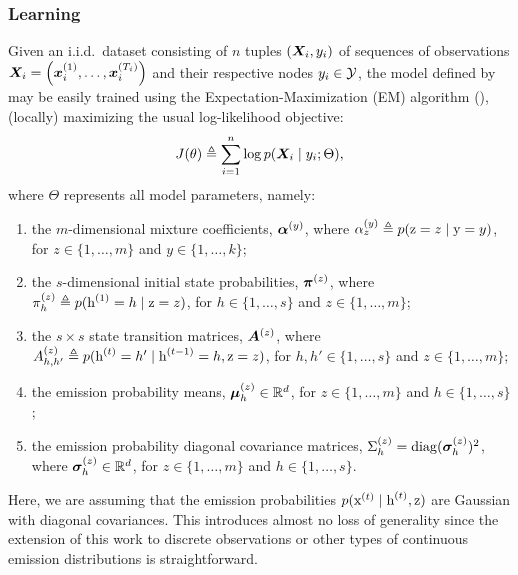 \subsubsection{Learning}
\label{sec:spamhmm_learning}
Given an i.i.d.\ dataset consisting of $n$ tuples $({\bm{X}}_i, y_i)$ of sequences of observations ${\bm{X}}_i = \left({\bm{x}}_i^{(1)}, \dots,{\bm{x}}_i^{(T_i)} \right)$ and their respective nodes $y_i \in {\mathcal{Y}}$, the model defined by  may be easily trained using the Expectation-Maximization (EM) algorithm (\citet{Dempster1977}), (locally) maximizing the usual log-likelihood objective:
\begin{equation}
    \label{eq:spamhmm_log_likelihood}
    J(\theta) \triangleq \sum_{i=1}^n \log p({\bm{X}}_i \mid y_i; \Theta),
\end{equation}
where $\Theta$ represents all model parameters, namely:
\begin{enumerate}
    \item the $m$-dimensional mixture coefficients, ${\bm{\alpha}}^{(y)}$, where $ {\alpha}^{(y)}_z \triangleq p({\textnormal{z}}=z \mid {\textnormal{y}}=y)$, for $z \in \{1,\dots,m\}$ and $y \in \{ 1,\dots,k \}$;
    \item the $s$-dimensional initial state probabilities, ${\bm{\pi}}^{(z)}$, where ${\pi}_h^{(z)} \triangleq p({\textnormal{h}}^{(1)}=h \mid {\textnormal{z}}=z)$, for $h \in \{1,\dots,s\}$ and $z \in \{1,\dots,m\}$;
    \item the $s \times s$ state transition matrices, ${\bm{A}}^{(z)}$, where ${A}^{(z)}_{h,h'} \triangleq p({\textnormal{h}}^{(t)}=h' \mid {\textnormal{h}}^{(t-1)}=h, {\textnormal{z}}=z)$, for $h,h' \in \{1,\dots,s\}$ and $z \in \{1,\dots,m\}$;
    \item the emission probability means, ${\bm{\mu}}^{(z)}_h \in \mathbb{R}^d$, for $z \in \{1,\dots,m\}$ and $h \in \{1,\dots,s\}$;
    \item the emission probability diagonal covariance matrices, $\Sigma^{(z)}_h = \mathrm{diag}({\bm{\sigma}}^{(z)}_h)^2$, where ${\bm{\sigma}}^{(z)}_h \in \mathbb{R}^d$, for $z \in \{1,\dots,m\}$ and $h \in \{1,\dots,s\}$.
\end{enumerate}

Here, we are assuming that the emission probabilities $p({\textnormal{x}}^{(t)}\mid{\textnormal{h}}^{(t)},{\textnormal{z}})$ are Gaussian with diagonal covariances. This introduces almost no loss of generality since the extension of this work to discrete observations or other types of continuous emission distributions is straightforward.

